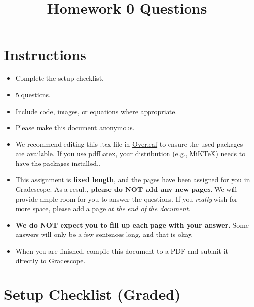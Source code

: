 \documentclass[11pt]{article}
\date{}
\title{\vspace{-1cm}Homework 0 Questions}
\begin{document}
\maketitle
\vspace{-2cm}
\thispagestyle{fancy}

\section*{Instructions}
\begin{itemize}
  \item Complete the setup checklist.
  \item 5 questions.
  \item Include code, images, or equations where appropriate.
  \item Please make this document anonymous.
  \item We recommend editing this .tex file in \href{https://www.overleaf.com/}{Overleaf} to ensure the used packages are available. If you use pdfLatex, your distribution (e.g., MiKTeX) needs to have the packages installed..
  \item This assignment is \textbf{fixed length}, and the pages have been assigned for you in Gradescope. As a result, \textbf{please do NOT add any new pages}. We will provide ample room for you to answer the questions. If you \emph{really} wish for more space, please add a page \emph{at the end of the document}.
  \item \textbf{We do NOT expect you to fill up each page with your answer.} Some answers will only be a few sentences long, and that is okay.
  \item When you are finished, compile this document to a PDF and submit it directly to Gradescope.

\end{itemize}

\section*{Setup Checklist (Graded)}
\end{document}
